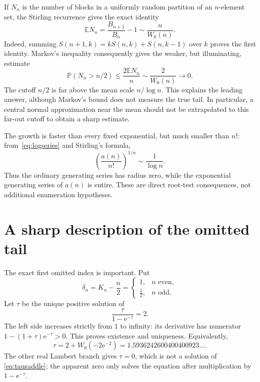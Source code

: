 \documentclass[11pt,a4paper]{article}
\numberwithin{equation}{section}
\theoremstyle{remark}
\newcommand{\e}{\mathrm e}
\newcommand{\Prob}{\mathbb P}
\newcommand{\Expect}{\mathbb E}
\begin{document}
If $N_n$ is the number of blocks in a uniformly random partition of an
$n$-element set, the Stirling recurrence gives the exact identity
\begin{equation}\label{eq:mean}
 \Expect N_n=\frac{B_{n+1}}{B_n}-1\sim\frac{n}{W_0(n)}.
\end{equation}
Indeed, summing $S(n+1,k)=kS(n,k)+S(n,k-1)$ over $k$ proves the first
identity. Markov's inequality consequently gives the weaker, but
illuminating, estimate
\[
 \Prob(N_n>n/2)\le\frac{2\Expect N_n}{n}\sim\frac2{W_0(n)}\to0.
\]
The cutoff $n/2$ is far above the mean scale $n/\log n$. This explains the
leading answer, although Markov's bound does not measure the true tail.
In particular, a central normal approximation near the mean should not
be extrapolated to this far-out cutoff to obtain a sharp estimate.

The growth is faster than every fixed exponential, but much smaller than
$n!$: from~\eqref{eq:logseries} and Stirling's formula,
\[
 \left(\frac{a(n)}{n!}\right)^{1/n}\sim\frac1{\log n}.
\]
Thus the ordinary generating series has radius zero, while the
exponential generating series of $a(n)$ is entire. These are direct
root-test consequences, not additional enumeration hypotheses.

\section{A sharp description of the omitted tail}\label{sec:tailstatement}

The exact first omitted index is important. Put
\begin{equation}\label{eq:delta}
 \delta_n=K_n-\frac n2
 =\begin{cases}1,&n\text{ even},\\[2pt]\tfrac12,&n\text{ odd}.
 \end{cases}
\end{equation}
Let $\tau$ be the unique positive solution of
\begin{equation}\label{eq:tausaddle}
 \frac{\tau}{1-\e^{-\tau}}=2.
\end{equation}
The left side increases strictly from $1$ to infinity: its derivative has
numerator $1-(1+\tau)\e^{-\tau}>0$. This proves existence and uniqueness.
Equivalently,
\begin{equation}\label{eq:taulambert}
 \tau=2+W_0(-2\e^{-2})=1.5936242600400400923\ldots.
\end{equation}
The other real Lambert branch gives $\tau=0$, which is not a solution of
\eqref{eq:tausaddle}; the apparent zero only solves the equation after
multiplication by $1-\e^{-\tau}$.
\end{document}
